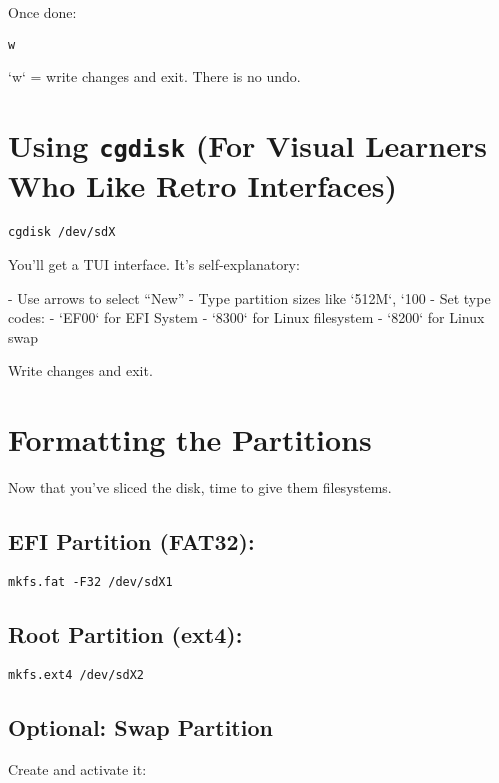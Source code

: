 \documentclass[12pt]{book}
\begin{document}
Once done:

\begin{lstlisting}
w
\end{lstlisting}

`w` = write changes and exit. There is no undo.

\section{Using \texttt{cgdisk} (For Visual Learners Who Like Retro Interfaces)}

\begin{lstlisting}
cgdisk /dev/sdX
\end{lstlisting}

You’ll get a TUI interface. It’s self-explanatory:

- Use arrows to select “New”
- Type partition sizes like `512M`, `100%
- Set type codes:
  - `EF00` for EFI System
  - `8300` for Linux filesystem
  - `8200` for Linux swap

Write changes and exit.

\section{Formatting the Partitions}

Now that you’ve sliced the disk, time to give them filesystems.

\subsection*{EFI Partition (FAT32):}

\begin{lstlisting}
mkfs.fat -F32 /dev/sdX1
\end{lstlisting}

\subsection*{Root Partition (ext4):}

\begin{lstlisting}
mkfs.ext4 /dev/sdX2
\end{lstlisting}

\subsection*{Optional: Swap Partition}

Create and activate it:
\end{document}
